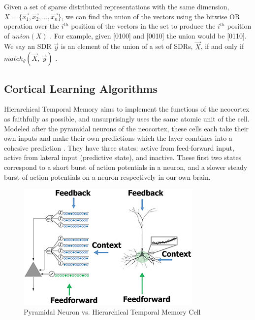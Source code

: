 \documentclass[oneside,12pt,openany]{book}
\begin{document}
	Given a set of sparse distributed representations with the same dimension, $X =\{\overrightarrow{x_{1}}, \overrightarrow{x_{2}}, ...,\overrightarrow{x_{n}}\}$, we can find the union of the vectors using the bitwise OR operation over the $i^{th}$ position of the vectors in the set to produce the $i^{th}$ position of $union(X)$ \cite{Properties}. For example, given [0100] and [0010] the union would be [0110]. We say an SDR $\overrightarrow{y}$ is an element of the union of a set of SDRs, $\overrightarrow{X}$, if and only if $match_{\theta}(\overrightarrow{X},\ \overrightarrow{y})$ \cite{Properties}.
	
	\subsection{Cortical Learning Algorithms}
	
	Hierarchical Temporal Memory aims to implement the functions of the neocortex as faithfully as possible, and unsurprisingly uses the same atomic unit of the cell. Modeled after the pyramidal neurons of the neocortex, these cells each take their own inputs and make their own predictions which the layer combines into a cohesive prediction \cite{Whitepaper}. They have three states: active from feed-forward input, active from lateral input (predictive state), and inactive. These first two states correspond to a short burst of action potentials in a neuron, and a slower steady burst of action potentials on a neuron respectively in our own brain.
	
	\begin{figure}[!ht]
		\centering
		\includegraphics[width=.7\linewidth]{images/HTMCell.jpg}
		\caption[Pyramidal Neuron vs. Hierarchical Temporal Memory Cell]{Pyramidal Neuron vs. Hierarchical Temporal Memory Cell~\cite{TheHTMSpatialPooler}}
		\label{fig:HTMCell}
	\end{figure}
\end{document}
